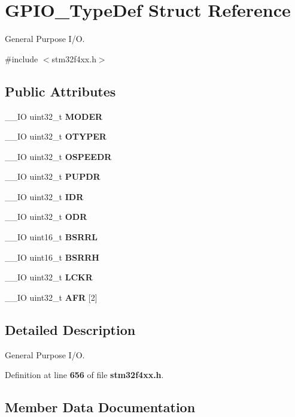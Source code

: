 \section{G\+P\+I\+O\+\_\+\+Type\+Def Struct Reference}
\label{structGPIO__TypeDef}


General Purpose I/O.  




{\ttfamily \#include $<$stm32f4xx.\+h$>$}

\subsection*{Public Attributes}
\begin{DoxyCompactItemize}
\item 
\+\_\+\+\_\+\+IO uint32\+\_\+t \textbf{ M\+O\+D\+ER}
\item 
\+\_\+\+\_\+\+IO uint32\+\_\+t \textbf{ O\+T\+Y\+P\+ER}
\item 
\+\_\+\+\_\+\+IO uint32\+\_\+t \textbf{ O\+S\+P\+E\+E\+DR}
\item 
\+\_\+\+\_\+\+IO uint32\+\_\+t \textbf{ P\+U\+P\+DR}
\item 
\+\_\+\+\_\+\+IO uint32\+\_\+t \textbf{ I\+DR}
\item 
\+\_\+\+\_\+\+IO uint32\+\_\+t \textbf{ O\+DR}
\item 
\+\_\+\+\_\+\+IO uint16\+\_\+t \textbf{ B\+S\+R\+RL}
\item 
\+\_\+\+\_\+\+IO uint16\+\_\+t \textbf{ B\+S\+R\+RH}
\item 
\+\_\+\+\_\+\+IO uint32\+\_\+t \textbf{ L\+C\+KR}
\item 
\+\_\+\+\_\+\+IO uint32\+\_\+t \textbf{ A\+FR} [2]
\end{DoxyCompactItemize}


\subsection{Detailed Description}
General Purpose I/O. 

Definition at line \textbf{ 656} of file \textbf{ stm32f4xx.\+h}.



\subsection{Member Data Documentation}
\mbox{\label{structGPIO__TypeDef_a7100354be30ab2f2248e2c3e94ace993}} 
